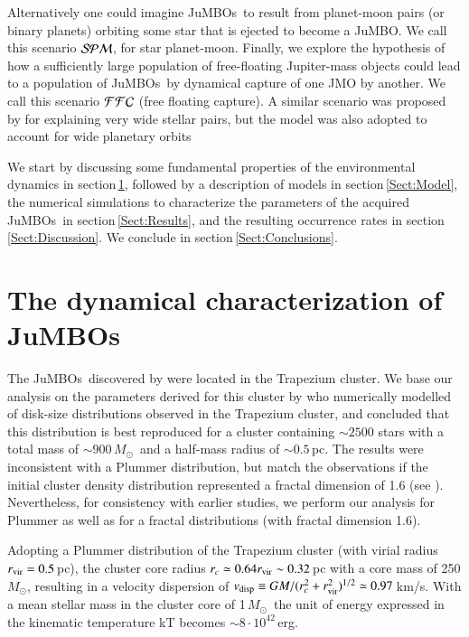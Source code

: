 \documentclass[submission,phys]{lib/SciPost}
\newcommand{\MSun}{\mbox{${M}_\odot$}}
\newcommand{\jumbo}{\mbox{JuMBO}}
\newcommand{\jumbos}{\mbox{JuMBOs}}
\begin{document}
Alternatively one could imagine \jumbos\, to result from planet-moon
pairs (or binary planets) orbiting some star that is ejected to become
a \jumbo.  We call this scenario ${\cal SPM}$, for star planet-moon.
Finally, we explore the hypothesis of how a sufficiently large
population of free-floating Jupiter-mass objects could lead to a
population of \jumbos\, by dynamical capture of one JMO by another.
We call this scenario ${\cal FFC}$ (free floating capture). A similar
scenario was proposed by \cite{2010MNRAS.404.1835K} for explaining
very wide stellar pairs, but the model was also adopted to account for
wide planetary orbits \cite{2012ApJ...750...83P,2018MNRAS.473.1589G}

We start by discussing some fundamental properties of the
environmental dynamics in section\,\ref{Sect:Characterize}, followed
by a description of models in section\,\ref{Sect:Model}, the numerical
simulations to characterize the parameters of the acquired \jumbos\,
in section\,\ref{Sect:Results}, and the resulting occurrence rates in
section\,\ref{Sect:Discussion}. We conclude in
section\,\ref{Sect:Conclusions}.

\section{The dynamical characterization of \jumbos}\label{Sect:Characterize}

The \jumbos\, discovered by \cite{2023arXiv231001231P} were located in
the Trapezium cluster. We base our analysis on the parameters derived
for this cluster by \cite{2016MNRAS.457..313P} who numerically
modelled of disk-size distributions observed in the Trapezium cluster,
and concluded that this distribution is best reproduced for a cluster
containing $\sim 2500$ stars with a total mass of $\sim 900$\,\MSun\,
and a half-mass radius of $\sim 0.5$\,pc. The results were
inconsistent with a Plummer \cite{1911MNRAS..71..460P} distribution,
but match the observations if the initial cluster density distribution
represented a fractal dimension of 1.6 (see
\cite{2004A&A...413..929G}).  Nevertheless, for consistency with
earlier studies, we perform our analysis for Plummer as well as for a
fractal distributions (with fractal dimension 1.6).

Adopting a Plummer distribution of the Trapezium cluster (with virial
radius $r_{\rm vir} = 0.5$\,pc), the cluster core radius $r_c \simeq
0.64r_{\rm vir} \sim 0.32$\,pc with a core mass of 250\,\MSun,
resulting in a velocity dispersion of $v_{\rm disp} \equiv GM/(r_c^2 +
r_{\rm vir}^2)^{1/2} \simeq 0.97$\,km/s. With a mean stellar mass in
the cluster core of 1\,\MSun\, the unit of energy expressed in the
kinematic temperature kT becomes $\sim 8 \cdot 10^{42}$\,erg.
\end{document}
